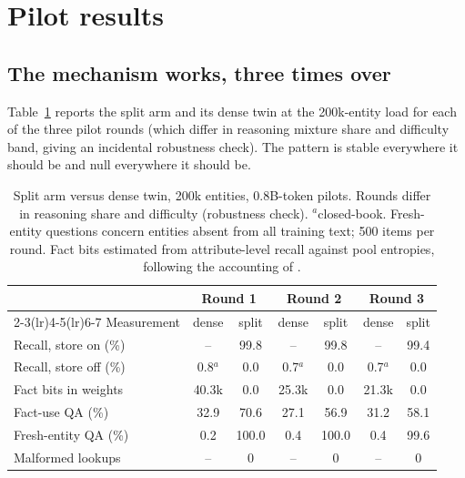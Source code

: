 \documentclass[11pt]{article}
\begin{document}
\section{Pilot results}

\subsection{The mechanism works, three times over}

Table~\ref{tab:mechanism} reports the split arm and its dense twin at the
200k-entity load for each of the three pilot rounds (which differ in
reasoning mixture share and difficulty band, giving an incidental
robustness check). The pattern is stable everywhere it should be and null
everywhere it should be.

\begin{table}[t]
\centering
\small
\begin{tabular}{lcccccc}
\toprule
& \multicolumn{2}{c}{Round 1} & \multicolumn{2}{c}{Round 2} & \multicolumn{2}{c}{Round 3}\\
\cmidrule(lr){2-3}\cmidrule(lr){4-5}\cmidrule(lr){6-7}
Measurement & dense & split & dense & split & dense & split\\
\midrule
Recall, store on (\%)        & --    & 99.8 & --   & 99.8 & --   & 99.4\\
Recall, store off (\%)       & 0.8$^{a}$  & 0.0  & 0.7$^{a}$ & 0.0  & 0.7$^{a}$ & 0.0\\
Fact bits in weights          & 40.3k & 0.0  & 25.3k & 0.0 & 21.3k & 0.0\\
Fact-use QA (\%)             & 32.9  & 70.6 & 27.1 & 56.9 & 31.2 & 58.1\\
Fresh-entity QA (\%)         & 0.2   & 100.0 & 0.4 & 100.0 & 0.4 & 99.6\\
Malformed lookups             & --    & 0    & --   & 0    & --   & 0\\
\bottomrule
\end{tabular}
\caption{Split arm versus dense twin, 200k entities, 0.8B-token pilots.
Rounds differ in reasoning share and difficulty (robustness check).
$^{a}$closed-book. Fresh-entity questions concern entities absent from
all training text; 500 items per round. Fact bits estimated from
attribute-level recall against pool entropies, following the accounting
of \cite{physics33}.}
\label{tab:mechanism}
\end{table}
\end{document}
